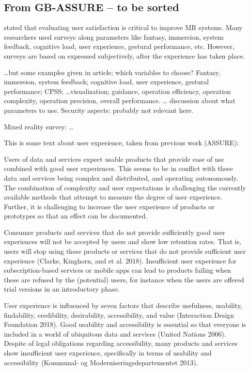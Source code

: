 \documentclass[11pt,english]{nik}
\begin{document}
\subsection{From GB-ASSURE -- to be sorted}

\citet{rokhsaritalemiReviewMixedReality2020} stated that evaluating user satisfaction is critical to improve MR systems. Many researchers used surveys along parameters like fantasy, immersion, system feedback, cognitive load, user experience, gestural performance, etc. However, surveys are based on expressed subjectively, after the experience has taken place. 

\dots but some examples given in article; which variables to choose? Fantasy, immersion, system feedback; cognitive load, user experience, gestural performance; CPSS; \dots visualization; guidance, operation efficiency, operation complexity, operation precision, overall performance. … discussion about what parameters to use. 
Security aspects: probably not relevant here. 

Mixed reality survey: \citet{Costanza2009} \dots

This is some text about user experience, taken from previous work (ASSURE):

Users of data and services expect usable products that provide ease of use combined with good user experiences. This seems to be in conflict with these data and services being complex and distributed, and operating autonomously. The combination of complexity and user expectations is challenging the currently available methods that attempt to measure the degree of user experience. Further, it is challenging to increase the user experience of products or prototypes so that an effect can be documented.

Consumer products and services that do not provide sufficiently good user experiences will not be accepted by users and show low retention rates. That is, users will stop using these products or services that do not provide sufficient user experience (Clarke, Kinghorn, and et al. 2018). Insufficient user experience for subscription-based services or mobile apps can lead to products failing when these are refused by the (potential) users, for instance when the users are offered trial versions in an introductory phase.

User experience is influenced by seven factors that describe usefulness, usability, findability, credibility, desirability, accessibility, and value  (Interaction Design Foundation 2018). Good usability and accessibility is essential so that everyone is included in a world of ubiquitous data and services (United Nations 2006). Despite of legal obligations regarding accessibility, many products and services show insufficient user experience, specifically in terms of usability and accessibility (Kommunal- og Moderniseringsdepartementet 2013). 
\end{document}
